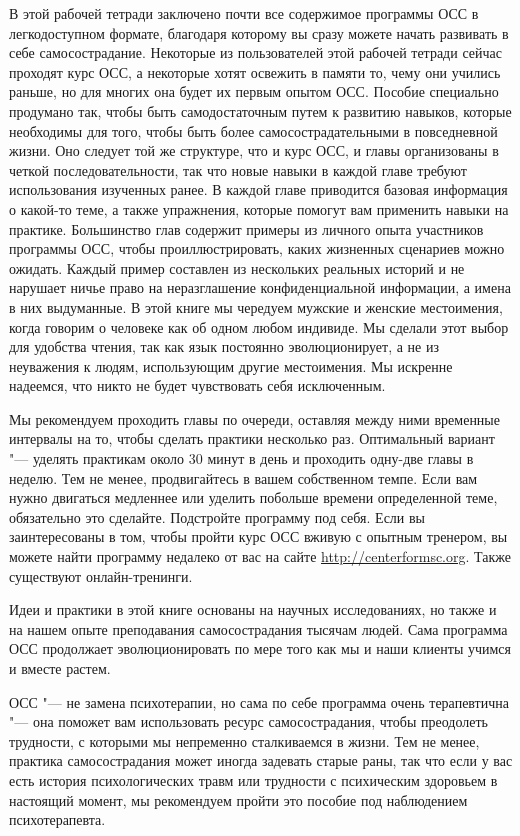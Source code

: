 	В этой рабочей тетради заключено почти все содержимое программы ОСС в легкодоступном формате, благодаря которому вы сразу можете начать развивать в себе самосострадание. Некоторые из пользователей этой рабочей тетради сейчас проходят курс ОСС, а некоторые хотят освежить в памяти то, чему они учились раньше, но для многих она будет их первым опытом ОСС. Пособие специально продумано так, чтобы быть самодостаточным путем к развитию навыков, которые необходимы для того, чтобы быть более самосострадательными в повседневной жизни. Оно следует той же структуре, что и курс ОСС, и главы организованы в четкой последовательности, так что новые навыки в каждой главе требуют использования изученных ранее. В каждой главе приводится базовая информация о какой-то теме, а также упражнения, которые помогут вам применить навыки на практике. Большинство глав содержит примеры из личного опыта участников программы ОСС, чтобы проиллюстрировать, каких жизненных сценариев можно ожидать. Каждый пример составлен из нескольких реальных историй и не нарушает ничье право на неразглашение конфиденциальной информации, а имена в них выдуманные. В этой книге мы чередуем мужские и женские местоимения, когда говорим о человеке как об одном любом индивиде. Мы сделали этот выбор для удобства чтения, так как язык постоянно эволюционирует, а не из неуважения к людям, использующим другие местоимения. Мы искренне надеемся, что никто не будет чувствовать себя исключенным. 
	
	Мы рекомендуем проходить главы по очереди, оставляя между ними временные интервалы на то, чтобы сделать практики несколько раз. Оптимальный вариант "--- уделять практикам около 30 минут в день и проходить одну-две главы в неделю. Тем не менее, продвигайтесь в вашем собственном темпе. Если вам нужно двигаться медленнее или уделить побольше времени определенной теме, обязательно это сделайте. Подстройте программу под себя. Если вы заинтересованы в том, чтобы пройти курс ОСС вживую с опытным тренером, вы можете найти программу недалеко от вас на сайте \url{http://centerformsc.org}. Также существуют онлайн-тренинги. 
	
	Идеи и практики в этой книге основаны на научных исследованиях, но также и на нашем опыте преподавания самосострадания тысячам людей. Сама программа ОСС продолжает эволюционировать по мере того как мы и наши клиенты учимся и вместе растем. 
	
	ОСС "--- не замена психотерапии, но сама по себе программа очень терапевтична "--- она поможет вам использовать ресурс самосострадания, чтобы преодолеть трудности, с которыми мы непременно сталкиваемся в жизни.  Тем не менее, практика самосострадания может иногда задевать старые раны, так что если у вас есть история психологических травм или трудности с психическим здоровьем в настоящий момент, мы рекомендуем пройти это пособие под наблюдением психотерапевта.
	
